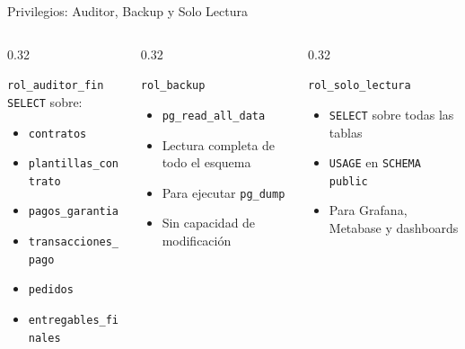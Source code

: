 \documentclass[aspectratio=169]{beamer}
\begin{document}
\begin{frame}{Privilegios: Auditor, Backup y Solo Lectura}
    \begin{columns}[T]
        \begin{column}{0.32\textwidth}
            \begin{block}{\scriptsize \texttt{rol\_auditor\_fin}}
                \scriptsize
                \texttt{SELECT} sobre:
                \begin{itemize}
                    \item \texttt{contratos}
                    \item \texttt{plantillas\_contrato}
                    \item \texttt{pagos\_garantia}
                    \item \texttt{transacciones\_pago}
                    \item \texttt{pedidos}
                    \item \texttt{entregables\_finales}
                \end{itemize}
            \end{block}
        \end{column}
        \begin{column}{0.32\textwidth}
            \begin{block}{\scriptsize \texttt{rol\_backup}}
                \scriptsize
                \begin{itemize}
                    \item \texttt{pg\_read\_all\_data}
                    \item Lectura completa de todo el esquema
                    \item Para ejecutar \texttt{pg\_dump}
                    \item Sin capacidad de modificación
                \end{itemize}
            \end{block}
        \end{column}
        \begin{column}{0.32\textwidth}
            \begin{block}{\scriptsize \texttt{rol\_solo\_lectura}}
                \scriptsize
                \begin{itemize}
                    \item \texttt{SELECT} sobre todas las tablas
                    \item \texttt{USAGE} en \texttt{SCHEMA public}
                    \item Para Grafana, Metabase y dashboards
                \end{itemize}
            \end{block}
        \end{column}
    \end{columns}


\end{frame}
\end{document}
